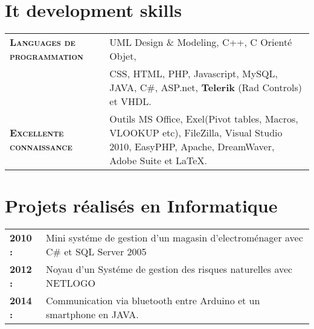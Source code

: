 \documentclass[a4paper,10pt]{article}
\begin{document}
\begin{minipage}[t]{0.43\textwidth}
\section{\LARGE{{It development skills} }}

\begin{tabularx}{1\linewidth}{>{\raggedright\scshape}p{2.5cm}X}
 
\textbf{{Languages de} {programmation}}&	UML Design \& Modeling, C++, C Orient\'e Objet,  \\ & CSS, HTML, PHP, Javascript, MySQL, JAVA, C\#, ASP.net, \textbf{Telerik} (Rad Controls) et VHDL.\\
\textbf{{Excellente connaissance}}   & Outils MS Office, Exel(Pivot tables, Macros, VLOOKUP etc), FileZilla,  Visual Studio 2010, EasyPHP, Apache, DreamWaver, Adobe Suite et \LaTeX. \\
\end{tabularx}


\end{minipage} 
\hfill
\begin{minipage}[t]{0.55\textwidth}

\section{\LARGE{Projets r\'ealis\'es en Informatique}}
\begin{tabularx}{300pt}{>{\raggedleft\scshape}p{29mm}X}
\textbf{2010 :} & Mini syst\'eme de gestion d'un magasin d'electrom\'enager avec C\# et SQL Server 2005\\ 
\textbf{2012 :} & Noyau d'un Syst\'eme de gestion des risques naturelles avec NETLOGO\\
\textbf{2014 :} & Communication via bluetooth entre Arduino et un smartphone en JAVA.\\
\end{tabularx}


\end{minipage} %
\end{document}
